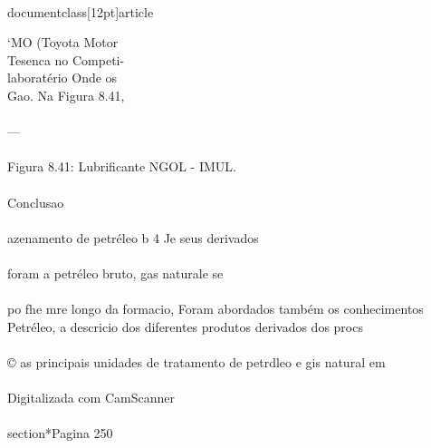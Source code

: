 \\documentclass[12pt]{article}
\begin{document}
‘MO (Toyota Motor\\
Tesenca no Competi-\\
laboratério Onde os\\
Gao. Na Figura 8.41,\\
\\
—\\
\\
Figura 8.41: Lubrificante NGOL - IMUL.\\
\\
Conclusao\\
\\
azenamento de petréleo b 4 Je seus derivados\\
\\
foram a petréleo bruto, gas naturale se\\
\\
po fhe mre longo da formacio, Foram abordados também os conhecimentos\\
Petréleo, a descricio dos diferentes produtos derivados dos procs\\
\\
© as principais unidades de tratamento de petrdleo e gis natural em\\
\\
Digitalizada com CamScanner\\

\\section*{Pagina 250}
\end{document}
